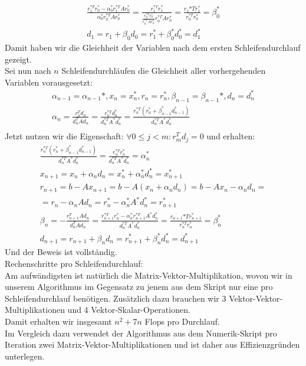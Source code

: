 \begin{align*}
  \frac{r_1^{*T}r_0^* -\alpha_0^*r_1^{*T}Ar_0^*}{\alpha_0^*r_0^{*T}Ar_0^*} = \frac{r_1^{*T}r_1^*}{\frac{r_0^{*T}r_0^*}{r_0^{*T}Ar_0^*}r_0^{*T}Ar_0^*}
  = \frac{r_1{*T}r_1^*}{r_0^{*T}r_0^*} = \beta_0^* \\
  d_1 = r_1 + \beta_0d_0 = r_1^* + \beta_0^*d_0^* = d_1^*
\end{align*}
Damit haben wir die Gleichheit der Variablen nach dem ersten Schleifendurchlauf gezeigt. \\
Sei nun nach $n$ Schleifendurchläufen die Gleichheit aller vorhergehenden Variablen vorausgesetzt: \\
\begin{align*}
  \alpha_{n-1} = \alpha_{n-1}*, x_n = x_n^*, r_n = r_n^*, \beta_{n-1} = \beta_{n-1}*, d_n = d_n^* \\
  \alpha_n = \frac{r_n^Td_n}{d_n^TAd_n} = \frac{r_n^{*T}d_n^*}{d_n^{*T}A^*d_n^*} = \frac{r_n^{*T}(r_n^* + \beta_{n-1}^*d_{n-1}^*)}{d_n^{*T}A^*d_n^*} \\
\end{align*}
Jetzt nutzen wir die Eigenschaft: $\forall 0 \leq j < m: r_m^Td_j = 0$ und erhalten:
\begin{align*}
  \frac{r_n^{*T}(r_n^* + \beta_{n-1}^*d_{n-1}^*)}{d_n^{*T}A^*d_n^*} = \frac{r_n^{*T}r_n^*}{d_n^{*T}A^*d_n^*} = \alpha_n^* \\
  x_{n+1} = x_n + \alpha_nd_n = x_n^* + \alpha_n^*d_n^* = x_{n+1}^* \\
  r_{n+1} = b - Ax_{n+1} = b - A(x_n + \alpha_nd_n) = b - Ax_n - \alpha_nd_n = \\
  = r_n - \alpha_nAd_n = r_n^* - \alpha_n^*A^*d_n^* = r_{n+1}^* \\
  \beta_n = - \frac{r_{n+1}^TAd_n}{d_n^TAd_n} = \frac{r_{n+1}^{*T}r_n^* - \alpha_n^*r_{n+1}^{*T}A^*d_n^*}{d_n^{*T}A^*d_n^*}
  = \frac{r_{n+1}{*T}r_{n+1}^*}{r_n^{*T}r_n^*} = \beta_n^* \\
  d_{n+1} = r_{n+1} + \beta_nd_n = r_{n+1}^* + \beta_n^*d_n^* = d_{n+1}^*
\end{align*}
Und der Beweis ist vollständig. \\

Rechenschritte pro Schleifendurchlauf: \\
Am aufwändigsten ist natürlich die Matrix-Vektor-Multiplikation, wovon wir in unserem Algorithmus
im Gegensatz zu jenem aus dem Skript nur eine pro Schleifendurchlauf benötigen.
Zusätzlich dazu brauchen wir 3 Vektor-Vektor-Multiplikationen und 4 Vektor-Skalar-Operationen. \\
Damit erhalten wir insgesamt $n^2+7n$ Flops pro Durchlauf. \\
Im Vergleich dazu verwendet der Algorithmus aus dem Numerik-Skript pro Iteration zwei Matrix-Vektor-Multiplikationen
und ist daher aus Effizienzgründen unterlegen. \\


